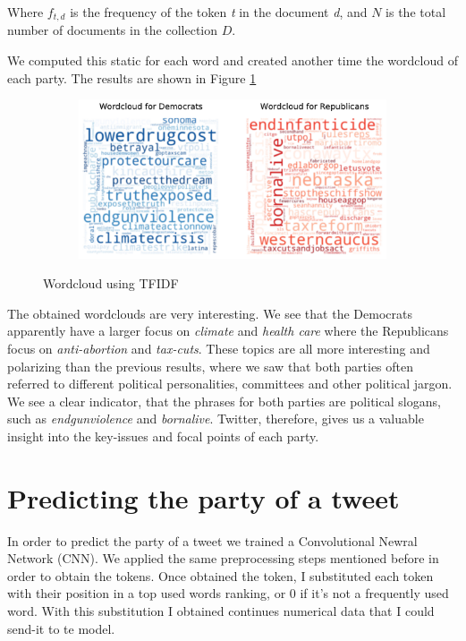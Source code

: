 \documentclass{article}
\begin{document}
Where $f_{t,d}$ is the frequency of the token \textit{t} in the document \textit{d}, and $N$ is the total number of documents in the collection $D$.

We computed this static for each word and created another time the wordcloud of each party. The results are shown in Figure \ref{fig:WordCloudTFIDF}

\begin{figure}[H]
    \centering
    \begin{subfigure}{.8\textwidth}
        \centering
        \includegraphics[width=1\textwidth]{./img/WordCloudTFIDF.pdf}
    \end{subfigure}
    \caption{Wordcloud using TFIDF}
    \label{fig:WordCloudTFIDF}
\end{figure}


The obtained wordclouds are very interesting. We see that the Democrats apparently have a larger focus on \textit{climate} and \textit{health care} where the Republicans focus on \textit{anti-abortion} and \textit{tax-cuts}. These topics are all more interesting and polarizing than the previous results, where we saw that both parties often referred to different political personalities, committees and other political jargon. We see a clear indicator, that the phrases for both parties are political slogans, such as \textit{endgunviolence} and \textit{bornalive}. Twitter, therefore, gives us a valuable insight into the key-issues and focal points of each party.

\section{Predicting the party of a tweet}
\label{CNN}

In order to predict the party of a tweet we trained a Convolutional Newral Network (CNN). We applied the same preprocessing steps mentioned before in order to obtain the tokens. Once obtained the token, I substituted each token with their position in a top used words ranking, or 0 if it's not a frequently used word. With this substitution I obtained continues numerical data that I could send-it to te model.
\end{document}
